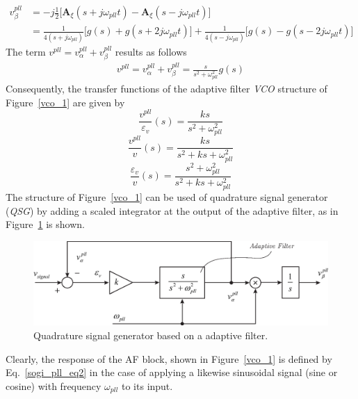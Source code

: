 \documentclass[11pt,a4paper,oneside]{book}
\numberwithin{equation}{section}
\theoremstyle{it}
\theoremstyle{definition}
\begin{document}
\begin{equation}
	\begin{aligned}
		v_\beta^{pll} &= -j\frac{1}{2} \Big[\mathbf{A}_\xi(s+j\omega_{pll}t)-\mathbf{A}_\xi(s-j\omega_{pll}t)\Big] \\[6pt]
		&= \frac{1}{4(s+j\omega_{pll})}\Big[g(s)+g(s+2j\omega_{pll}t)\Big]+\frac{1}{4(s-j\omega_{pll})}\Big[g(s)-g(s-2j\omega_{pll}t)\Big]
	\end{aligned}
\end{equation}
The term $v^{pll}=v_\alpha^{pll}+v_\beta^{pll}$ results as follows
\begin{equation}\label{sogi_pll_eq1}
	\begin{aligned}
		v^{pll} = v_\alpha^{pll}+v_\beta^{pll} = \frac{s}{s^2+\omega_{pll}^2}g(s)
	\end{aligned}
\end{equation}
Consequently, the transfer functions of the adaptive filter \textit{VCO} structure of Figure~\ref{vco_1} are given by
\begin{equation}\label{sogi_pll_eq2}
	\frac{v^{pll}}{\varepsilon_{v}}(s)=\frac{ks}{s^2+\omega_{pll}^2}
\end{equation}
\begin{equation}
	\frac{v^{pll}}{v}(s)=\frac{ks}{s^2+ks+\omega_{pll}^2}
\end{equation}
\begin{equation}
	\frac{\varepsilon_{v}}{v}(s)=\frac{s^2+\omega_{pll}^2}{s^2+ks+\omega_{pll}^2}
\end{equation}
The structure of Figure~\ref{vco_1} can be used of quadrature signal generator (\textit{QSG}) by adding a scaled integrator at the output of the adaptive filter, as in Figure~\ref{qsg_1} is shown. 
\begin{figure}[H]
	\centering
	\includegraphics[width = 350pt, angle = 0, 
	keepaspectratio]{figures/qsg_1.eps}
	\captionsetup{width=0.5\textwidth, font=small}
	\caption{Quadrature signal generator based on a adaptive filter.}
	\label{qsg_1}
\end{figure}
Clearly, the response of the AF block, shown in Figure~\ref{vco_1} is defined by Eq.~\eqref{sogi_pll_eq2} in the case of applying a likewise sinusoidal signal (sine or cosine) with frequency $\omega_{pll}$ to its input.
\end{document}
